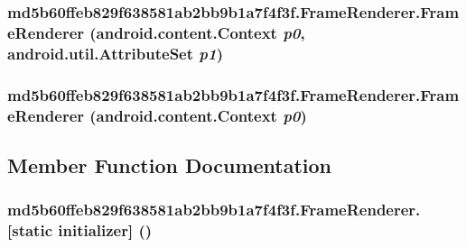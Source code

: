 \hypertarget{classmd5b60ffeb829f638581ab2bb9b1a7f4f3f_1_1_frame_renderer_b87d8b45ebd480c87ae285c0c10dccc9}{
\subsubsection[{FrameRenderer}]{\setlength{\rightskip}{0pt plus 5cm}md5b60ffeb829f638581ab2bb9b1a7f4f3f.FrameRenderer.FrameRenderer (android.content.Context {\em p0}, \/  android.util.AttributeSet {\em p1})}}
\label{classmd5b60ffeb829f638581ab2bb9b1a7f4f3f_1_1_frame_renderer_b87d8b45ebd480c87ae285c0c10dccc9}


\hypertarget{classmd5b60ffeb829f638581ab2bb9b1a7f4f3f_1_1_frame_renderer_4f57e2437910b58d5918efe5a2232974}{
\subsubsection[{FrameRenderer}]{\setlength{\rightskip}{0pt plus 5cm}md5b60ffeb829f638581ab2bb9b1a7f4f3f.FrameRenderer.FrameRenderer (android.content.Context {\em p0})}}
\label{classmd5b60ffeb829f638581ab2bb9b1a7f4f3f_1_1_frame_renderer_4f57e2437910b58d5918efe5a2232974}




\subsection{Member Function Documentation}
\hypertarget{classmd5b60ffeb829f638581ab2bb9b1a7f4f3f_1_1_frame_renderer_f90b327fd28f92712dac1abd641877e1}{
\subsubsection[{[static initializer]}]{\setlength{\rightskip}{0pt plus 5cm}md5b60ffeb829f638581ab2bb9b1a7f4f3f.FrameRenderer.\mbox{[}static initializer\mbox{]} ()}}
\label{classmd5b60ffeb829f638581ab2bb9b1a7f4f3f_1_1_frame_renderer_f90b327fd28f92712dac1abd641877e1}




